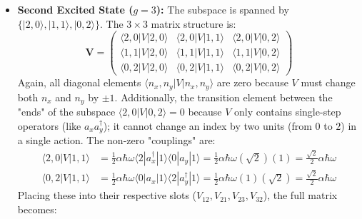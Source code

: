 \begin{solution}
\begin{itemize}
    \begin{equation*}
        \mathbf{V} = \frac{1}{2} \alpha \hbar\omega \begin{pmatrix} 0 & 1 \\ 1 & 0 \end{pmatrix}
    \end{equation*}
    The eigenvalues (energy shifts) are $E^{(1)} = \pm \frac{1}{2} \alpha \hbar\omega$. The corrected energies for the first excited states are $E_1 \approx 2\hbar\omega \pm \frac{1}{2}\alpha\hbar\omega$.
    \item \textbf{Second Excited State ($g=3$):} The subspace is spanned by $\{|2, 0\rangle, |1, 1\rangle, |0, 2\rangle\}$. The $3 \times 3$ matrix structure is:
    \begin{equation*}
        \mathbf{V} = \begin{pmatrix} 
            \langle 2, 0 | V | 2, 0 \rangle & \langle 2, 0 | V | 1, 1 \rangle & \langle 2, 0 | V | 0, 2 \rangle \\
            \langle 1, 1 | V | 2, 0 \rangle & \langle 1, 1 | V | 1, 1 \rangle & \langle 1, 1 | V | 0, 2 \rangle \\
            \langle 0, 2 | V | 2, 0 \rangle & \langle 0, 2 | V | 1, 1 \rangle & \langle 0, 2 | V | 0, 2 \rangle
        \end{pmatrix}
    \end{equation*}
    Again, all diagonal elements $\langle n_x, n_y | V | n_x, n_y \rangle$ are zero because $V$ must change both $n_x$ and $n_y$ by $\pm 1$. Additionally, the transition element between the "ends" of the subspace $\langle 2, 0 | V | 0, 2 \rangle = 0$ because $V$ only contains single-step operators (like $a_x a_y^\dagger$); it cannot change an index by two units (from $0$ to $2$) in a single action.
    The non-zero "couplings" are:
    \begin{align*}
        \langle 2, 0 | V | 1, 1 \rangle &= \frac{1}{2}\alpha\hbar\omega \langle 2|a_x^\dagger|1\rangle \langle 0|a_y|1\rangle = \frac{1}{2}\alpha\hbar\omega (\sqrt{2})(1) = \frac{\sqrt{2}}{2}\alpha\hbar\omega \\
        \langle 0, 2 | V | 1, 1 \rangle &= \frac{1}{2}\alpha\hbar\omega \langle 0|a_x|1\rangle \langle 2|a_y^\dagger|1\rangle = \frac{1}{2}\alpha\hbar\omega (1)(\sqrt{2}) = \frac{\sqrt{2}}{2}\alpha\hbar\omega
    \end{align*}
    Placing these into their respective slots ($V_{12}, V_{21}, V_{23}, V_{32}$), the full matrix becomes:
    \begin{equation*}

\end{equation*}
\end{itemize}
\end{solution}
